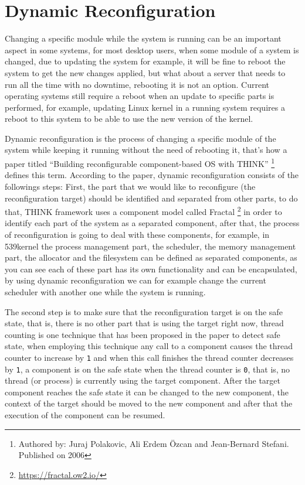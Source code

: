 \section{Dynamic Reconfiguration}\label{dynamic-reconfiguration}

Changing a specific module while the system is running can be an
important aspect in some systems, for most desktop users, when some
module of a system is changed, due to updating the system for example,
it will be fine to reboot the system to get the new changes applied, but
what about a server that needs to run all the time with no downtime,
rebooting it is not an option. Current operating systems still require a
reboot when an update to specific parts is performed, for example,
updating Linux kernel in a running system requires a reboot to this
system to be able to use the new version of the kernel.

Dynamic reconfiguration is the process of changing a specific module of
the system while keeping it running without the need of rebooting it,
that's how a paper titled ``Building reconfigurable component-based OS
with THINK'' \footnote{Authored by: Juraj Polakovic, Ali Erdem Özcan and
  Jean-Bernard Stefani. Published on 2006} defines this term. According
to the paper, dynamic reconfiguration consists of the followings steps:
First, the part that we would like to reconfigure (the reconfiguration
target) should be identified and separated from other parts, to do that,
THINK framework uses a component model called Fractal \footnote{\url{https://fractal.ow2.io/}}
in order to identify each part of the system as a separated component,
after that, the process of reconfiguration is going to deal with these
components, for example, in 539kernel the process management part, the
scheduler, the memory management part, the allocator and the filesystem
can be defined as separated components, as you can see each of these
part has its own functionality and can be encapsulated, by using dynamic
reconfiguration we can for example change the current scheduler with
another one while the system is running.

The second step is to make sure that the reconfiguration target is on
the safe state, that is, there is no other part that is using the target
right now, thread counting is one technique that has been proposed in
the paper to detect safe state, when employing this technique any call
to a component causes the thread counter to increase by \lstinline!1!
and when this call finishes the thread counter decreases by
\lstinline!1!, a component is on the safe state when the thread counter
is \lstinline!0!, that is, no thread (or process) is currently using the
target component. After the target component reaches the safe state it
can be changed to the new component, the context of the target should be
moved to the new component and after that the execution of the component
can be resumed.


